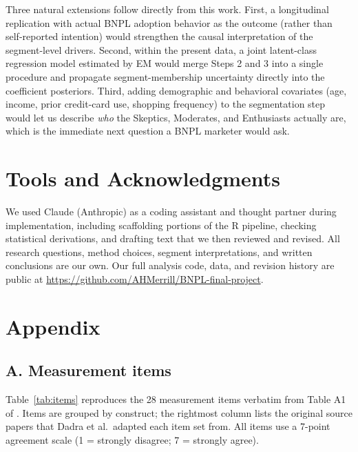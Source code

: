 \documentclass[11pt]{article}
\begin{document}
Three natural extensions follow directly from this work. First, a
longitudinal replication with actual BNPL adoption behavior as the
outcome (rather than self-reported intention) would strengthen the
causal interpretation of the segment-level drivers. Second, within the
present data, a joint latent-class regression model estimated by EM
would merge Steps 2 and 3 into a single procedure and propagate
segment-membership uncertainty directly into the coefficient
posteriors. Third, adding demographic and behavioral covariates (age,
income, prior credit-card use, shopping frequency) to the segmentation
step would let us describe \emph{who} the Skeptics, Moderates, and
Enthusiasts actually are, which is the immediate next question a BNPL
marketer would ask.

\section*{Tools and Acknowledgments}

We used Claude (Anthropic) as a coding assistant and thought partner
during implementation, including scaffolding portions of the R
pipeline, checking statistical derivations, and drafting text that we
then reviewed and revised. All research questions, method choices,
segment interpretations, and written conclusions are our own. Our
full analysis code, data, and revision history are public at
\url{https://github.com/AHMerrill/BNPL-final-project}.




\appendix
\section*{Appendix}

\subsection*{A. Measurement items} \label{appendix:items}

Table~\ref{tab:items} reproduces the 28 measurement items verbatim
from Table A1 of \citet{dadra2024tep}. Items are grouped by
construct; the rightmost column lists the original source papers
that Dadra et al.\ adapted each item set from. All items use a
7-point agreement scale (1 = strongly disagree; 7 = strongly agree).
\end{document}
